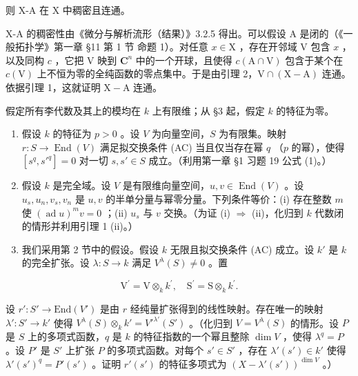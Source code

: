 则 X-A 在 X 中稠密且连通。

X-A 的稠密性由《微分与解析流形（结果）》3.2.5 得出。可以假设 A 是闭的（《一般拓扑学》第一章 §11 第 1 节 命题 1）。对任意 \(x \in \mathrm{X}\) ，存在开邻域 \(\mathrm{V}\) 包含 \(x\) ，以及同构 \(c\) ，它把 \(\mathrm{V}\) 映到 \(\mathbf{C}^n\) 中的一个开球，且使得 \(c(\mathrm{A} \cap \mathrm{V})\) 包含于某个在 \(c(\mathrm{V})\) 上不恒为零的全纯函数的零点集中。于是由引理 2，\(\mathrm{V} \cap (\mathrm{X} - \mathrm{A})\) 连通。依据引理 1，这就证明 \(\mathrm{X} - \mathrm{A}\) 连通。


假定所有李代数及其上的模均在 \(k\) 上有限维；从 §3 起，假定 \(k\) 的特征为零。


\begin{enumerate}
\def\labelenumi{\arabic{enumi})}
\item
  假设 \(k\) 的特征为 \(p > 0\) 。设 \(V\) 为向量空间，\(S\) 为有限集。映射 \(r: S \to \operatorname{End}(V)\) 满足拟交换条件 (AC) 当且仅当存在幂 \(q\) （\(p\) 的幂），使得 \([s^q, s'^q] = 0\) 对一切 \(s, s' \in S\) 成立。（利用第一章 §1 习题 19 公式 (1)。）
\item
  假设 \(k\) 是完全域。设 \(V\) 是有限维向量空间，\(u, v \in \operatorname{End}(V)\) 。设 \(u_s, u_n, v_s, v_n\) 是 \(u, v\) 的半单分量与幂零分量。下列条件等价：(i) 存在整数 \(m\) 使 \((\operatorname{ad} u)^m v = 0\) ；(ii) \(u_s\) 与 \(v\) 交换。（为证 (i) \(\Longrightarrow\) (ii)，化归到 \(k\) 代数闭的情形并利用引理 1 (ii)。）
\item
  我们采用第 2 节中的假设。假设 \(k\) 无限且拟交换条件 (AC) 成立。设 \(k'\) 是 \(k\) 的完全扩张。设 \(\lambda : S \to k\) 满足 \(V^{\lambda}(S) \neq 0\) 。置
\end{enumerate}

\[
\mathrm{V} ^ {\prime} = \mathrm{V} \otimes_ {k} k ^ {\prime}, \quad \mathrm{S} ^ {\prime} = \mathrm{S} \otimes_ {k} k ^ {\prime}.
\]

设 \(r' : S' \to \text{End}(V')\) 是由 \(r\) 经纯量扩张得到的线性映射。存在唯一的映射 \(\lambda' : S' \to k'\) 使得 \(V^{\lambda}(S) \otimes_k k' = V'^{\lambda'}(S')\) 。（化归到 \(V = V^{\lambda}(S)\) 的情形。设 \(P\) 是 \(S\) 上的多项式函数，\(q\) 是 \(k\) 的特征指数的一个幂且整除 \(\dim V\) ，使得 \(\lambda^q = P\) 。设 \(P'\) 是 \(S'\) 上扩张 \(P\) 的多项式函数。对每个 \(s' \in S'\) ，存在 \(\lambda'(s') \in k'\) 使得 \(\lambda'(s')^q = P'(s')\) 。证明 \(r'(s')\) 的特征多项式为 \((X - \lambda'(s'))^{\dim V}\) 。）

